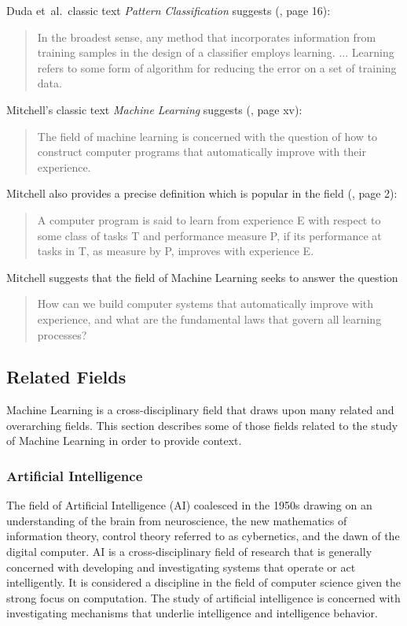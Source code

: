 Duda et~al.\ classic text \emph{Pattern Classification} suggests (\cite{Duda2001}, page 16):

\begin{quotation}
In the broadest sense, any method that incorporates information from training samples in the design of a classifier employs learning. ... Learning refers to some form of algorithm for reducing the error on a set of training data.
\end{quotation}

Mitchell's classic text \emph{Machine Learning} suggests (\cite{Mitchell1997}, page xv):

\begin{quotation}
The field of machine learning is concerned with the question of how to construct computer programs that automatically improve with their experience.
\end{quotation}

Mitchell also provides a precise definition which is popular in the field (\cite{Mitchell1997}, page 2):

\begin{quotation}
A computer program is said to learn from experience E with respect to some class of tasks T and performance measure P, if its performance at tasks in T, as measure by P, improves with experience E.
\end{quotation}

Mitchell suggests that the field of Machine Learning seeks to answer the question \cite{Mitchell2006}

\begin{quotation}
How can we build computer systems that automatically improve with experience, and what are the fundamental laws that govern all learning processes?
\end{quotation}

\subsection{Related Fields}
\label{subsec:related_fields}
Machine Learning is a cross-disciplinary field that draws upon many related and overarching fields. This section describes some of those fields related to the study of Machine Learning in order to provide context.

\subsubsection{Artificial Intelligence}
The field of Artificial Intelligence (AI) coalesced in the 1950s drawing on an understanding of the brain from neuroscience, the new mathematics of information theory, control theory referred to as cybernetics, and the dawn of the digital computer. AI is a cross-disciplinary field of research that is generally concerned with developing and investigating systems that operate or act intelligently. It is considered a discipline in the field of computer science given the strong focus on computation. The study of artificial intelligence is concerned with investigating mechanisms that underlie intelligence and intelligence behavior.

